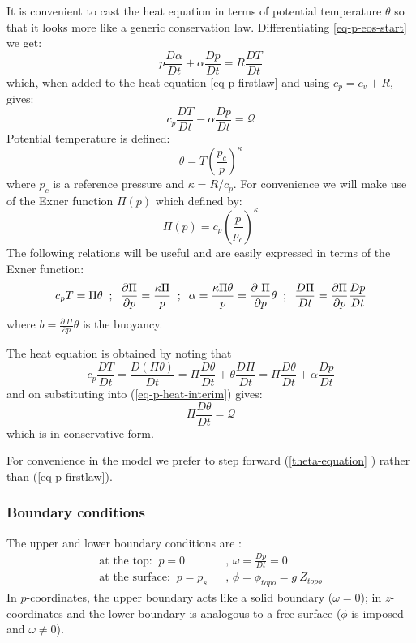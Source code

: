 It is convenient to cast the heat equation in terms of potential temperature 
$\theta $ so that it looks more like a generic conservation law.
Differentiating \ref{eq-p-eos-start} we get: 
\[
p\frac{D\alpha }{Dt}+\alpha \frac{Dp}{Dt}=R\frac{DT}{Dt}
\]
which, when added to the heat equation \ref{eq-p-firstlaw} and using $%
c_{p}=c_{v}+R$, gives: 
\begin{equation}
c_{p}\frac{DT}{Dt}-\alpha \frac{Dp}{Dt}=\mathcal{Q}
\label{eq-p-heat-interim}
\end{equation}
Potential temperature is defined: 
\begin{equation}
\theta =T(\frac{p_{c}}{p})^{\kappa }  \label{eq:potential-temp}
\end{equation}
where $p_{c}$ is a reference pressure and $\kappa =R/c_{p}$. For convenience
we will make use of the Exner function $\Pi (p)$ which defined by: 
\begin{equation}
\Pi (p)=c_{p}(\frac{p}{p_{c}})^{\kappa }  \label{Exner}
\end{equation}
The following relations will be useful and are easily expressed in terms of
the Exner function: 
\[
c_{p}T=\Pi \theta \;\;;\;\;\frac{\partial \Pi }{\partial p}=\frac{\kappa \Pi 
}{p}\;\;;\;\;\alpha =\frac{\kappa \Pi \theta }{p}=\frac{\partial \ \Pi }{%
\partial p}\theta \;\;;\;\;\frac{D\Pi }{Dt}=\frac{\partial \Pi }{\partial p}%
\frac{Dp}{Dt}
\]
where $b=\frac{\partial \ \Pi }{\partial p}\theta $ is the buoyancy.

The heat equation is obtained by noting that 
\[
c_{p}\frac{DT}{Dt}=\frac{D(\Pi \theta )}{Dt}=\Pi \frac{D\theta }{Dt}+\theta 
\frac{D\Pi }{Dt}=\Pi \frac{D\theta }{Dt}+\alpha \frac{Dp}{Dt}
\]
and on substituting into (\ref{eq-p-heat-interim}) gives: 
\begin{equation}
\Pi \frac{D\theta }{Dt}=\mathcal{Q}  \label{eq:potential-temperature-equation}
\end{equation}
which is in conservative form.

For convenience in the model we prefer to step forward (\ref{theta-equation}%
) rather than (\ref{eq-p-firstlaw}).

\subsubsection{Boundary conditions}

The upper and lower boundary conditions are : 
\begin{eqnarray*}
\mbox{at the top:}\;\;p=0 &&\text{, }\omega =\frac{Dp}{Dt}=0 \\
\mbox{at the surface:}\;\;p=p_{s} &&\text{, }\phi =\phi _{topo}=g~Z_{topo}
\label{eq:boundary-condition-atmosphere}
\end{eqnarray*}
In $p$-coordinates, the upper boundary acts like a solid boundary ($\omega
=0 $); in $z$-coordinates and the lower boundary is analogous to a free
surface ($\phi $ is imposed and $\omega \neq 0$).

